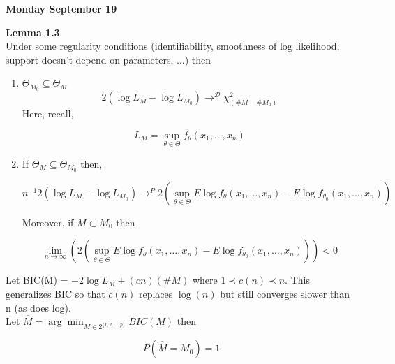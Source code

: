 \documentclass[11pt,fleqn]{book} %
\begin{document}
 


 \textbf{Monday September 19}


\textbf{Lemma 1.3}\\

Under some regularity conditions (identifiability, smoothness of log likelihood, support doesn't depend on parameters, ...) then 
	\begin{enumerate}
	 	\item $\Theta_{M_0} \subseteq \Theta_M$ 
	 	 $$2(\log L_M - \log L_{M_0}) \rightarrow^\mathscr{D} \chi^2_{(\#M - \#M_0)}$$
	 		Here, recall, 

	 			$$L_M = \sup_{\theta \in \Theta} f_\theta(x_1, \dots, x_n) $$
	 	\item If $\Theta_M \subseteq \Theta_{M_0}$ then,

	 		$$n^{-1}2(\log L_M - \log L_{M_0}) \rightarrow^P  2(\sup_{\theta \in \Theta} E\log f_\theta(x_1, \dots, x_n) - E \log f_{\theta_0}(x_1, \dots, x_n))$$

	 		Moreover, if $M \subset M_0 $ then

	 		$$\lim_{n\rightarrow \infty} (2(\sup_{\theta \in \Theta} E\log f_\theta(x_1, \dots, x_n) - E \log f_{\theta_0}(x_1, \dots, x_n))) < 0  $$
	 \end{enumerate} 

\begin{theorem}
	 	Let BIC(M) = $-2 \log L_M + (c n)(\#M)$ where $ 1 \prec c(n) \prec n$. This generalizes BIC so that $c(n)$ replaces $\log(n)$ but still converges slower than n (as does log).\\

	 	Let $\hat{M} = \arg \min_{M \in 2^{\{1, 2, \dots, p\}}} BIC(M)$ then

	 	$$P(\hat{M} = M_0) = 1 $$


	 \end{theorem}	 
\end{document}
